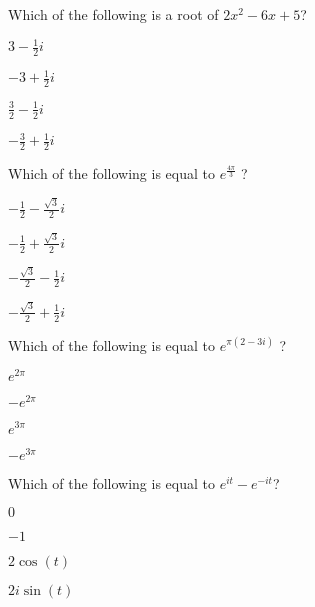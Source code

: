 \begin{readinessAssuranceTest}
\setlength{\itemsep}{0.6in}


\item Which of the following is a root of \(2x^2-6x+5\)?
\begin{multicols}{4}
\begin{readinessAssuranceTestChoices}
\item \(3-\frac{1}{2}i\)
\item \(-3+\frac{1}{2}i\)
\item \(\frac{3}{2}-\frac{1}{2}i\) %
\item \(-\frac{3}{2}+\frac{1}{2}i\)
\end{readinessAssuranceTestChoices}
\end{multicols}

\item Which of the following is equal to \(e^{\frac{4\pi}{3}}\) ?
\begin{multicols}{4}
\begin{readinessAssuranceTestChoices}
\item \(-\frac{1}{2}-\frac{\sqrt{3}}{2}i \)
\item \(-\frac{1}{2}+\frac{\sqrt{3}}{2}i \)
\item \(-\frac{\sqrt{3}}{2}-\frac{1}{2}i \)
\item \(-\frac{\sqrt{3}}{2}+\frac{1}{2}i \)
\end{readinessAssuranceTestChoices}
\end{multicols}

\item Which of the following is equal to \(e^{\pi (2-3i)}\) ?
\begin{multicols}{4}
\begin{readinessAssuranceTestChoices}
\item \( e^{2\pi} \)
\item \(-e^{2\pi} \) %
\item \( e^{3\pi} \)
\item \(-e^{3\pi} \)
\end{readinessAssuranceTestChoices}
\end{multicols}

\item Which of the following is equal to \( e^{it}-e^{-it} \)?
\begin{multicols}{4}
\begin{readinessAssuranceTestChoices}
\item \( 0 \)
\item \( -1 \)
\item \( 2 \cos(t) \)
\item \( 2i \sin(t) \) %
\end{readinessAssuranceTestChoices}
\end{multicols}


\end{readinessAssuranceTest}
